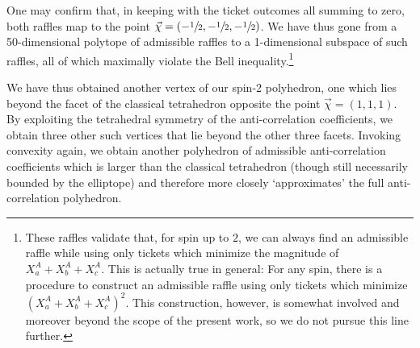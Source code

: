 One may confirm that, in keeping with the ticket outcomes all summing to zero, both raffles map to the point $\vec{\chi}=(-\sfrac12,-\sfrac12,-\sfrac12)$. We have thus gone from a 50-dimensional polytope of admissible raffles to a 1-dimensional subspace of such raffles, all of which maximally violate the Bell inequality.\footnote{These raffles validate that, for spin up to $2$, we can always find an admissible raffle while using only tickets which minimize the magnitude of $X_a^A+X_b^A+X_c^A$. This is actually true in general: For any spin, there is a procedure to construct an admissible raffle using only tickets which minimize $(X_a^A+X_b^A+X_c^A)^2$. This construction, however, is somewhat involved and moreover beyond the scope of the present work, so we do not pursue this line further.}


We have thus obtained another vertex of our spin-2 polyhedron, one which lies beyond the facet of the classical tetrahedron opposite the point $\vec{\chi}=(1,1,1)$. By exploiting the tetrahedral symmetry of the anti-correlation coefficients, we obtain three other such vertices that lie beyond the other three facets. Invoking convexity again, we obtain another polyhedron of admissible anti-correlation coefficients which is larger than the classical tetrahedron (though still necessarily bounded by the elliptope) and therefore more closely `approximates' the full anti-correlation polyhedron.

